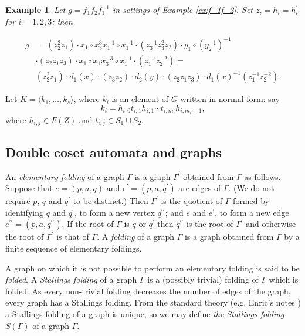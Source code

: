 \documentclass[a4paper,12pt]{article}
\newcommand{\G}{\Gamma }
\newtheorem{exam}[theorem]{Example}
\newenvironment{example}{\begin{exam} \rm}{\end{exam}}
\numberwithin{equation}{section}
\numberwithin{figure}{section}
\newcommand{\la}{\langle}
\newcommand{\ra}{\rangle}
\begin{document}
\begin{example}\label{ex:g}
Let $g =f_1 f_2 f_1^{-1}$ in settings of Example \ref{ex:f_1f_2}.
Set $z_i = h_i = h_i^{\prime}$ for $i= 1,2,3$; then

\begin{align*}
g &= (z_2^2z_1)\cdot x_1 \circ x_3^3x_1^{-1} \circ x_1^{-1}\cdot
(z_3^{-1}z_3^2z_2) \cdot y_1 \circ (y_2^{-1})^{-1}\\ &\cdot(z_2 z_1 z_3)\cdot x_1\circ x_1 x_3^{-3} \circ x_1^{-1}\cdot (z_1^{-1}z_2^{-2})=\\
&(z_2^2z_1)\cdot d_1(x) \cdot (z_3z_2) \cdot d_2(y) \cdot(z_2 z_1
z_3) \cdot d_1(x)^{-1} (z_1^{-1}z_2^{-2}).
\end{align*}

\end{example}


Let $K=\la k_1, \ldots , k_s\ra$, where $k_i$ is an element of $G$
written in normal form: say
\begin{equation}\label{eq:k-form}
k_i= h_{i,0}t_{i,1}h_{i,1}\cdots t_{i,m_i}h_{i,m_i+1},
\end{equation}
where $h_{i,j}\in F(Z)$ and $t_{i,j}\in S_1\cup S_2$.

\subsection{Double coset automata and graphs}

An {\em elementary folding} of a graph $\G$ is a graph $\G^\prime$
obtained from $\G$ as follows. Suppose that $e=(p,a,q)$ and
$e^\prime=(p,a,q^\prime)$
are edges of $\G$. (We do not require $p$, $q$ and $q^\prime$ to be distinct.)
 Then $\G^\prime$ is the quotient of $\G$ formed by identifying
$q$ and $q^\prime$, to form a new vertex $q^{\prime\prime}$; and
$e$ and $e^\prime$, to form a new edge
$e^{\prime\prime}=(p,a,q^{\prime\prime})$. If the root of $\G$ is $q$
 or $q^\prime$ then $q^{\prime\prime}$ is the root of $\G^\prime$ and otherwise
 the root of $\G^\prime$ is that of $\G$.
 A {\em folding} of a graph $\G$ is a graph obtained
from $\G$ by a finite sequence of elementary foldings.

A graph on which  it is not possible to perform an elementary
folding is
said to be {\em folded}. A {\em Stallings folding} of a graph $\G$ is
 a (possibly trivial) folding of $\G$ which is folded. As every non-trivial
folding decreases
 the number of edges of the graph, every graph has a Stallings folding.
From the
standard theory (e.g. Enric's notes \cite{ventura11}) a Stallings folding of a graph is unique,
so we may define {\em the Stallings folding} $S(\G)$ of a graph $\G$.
\end{document}
